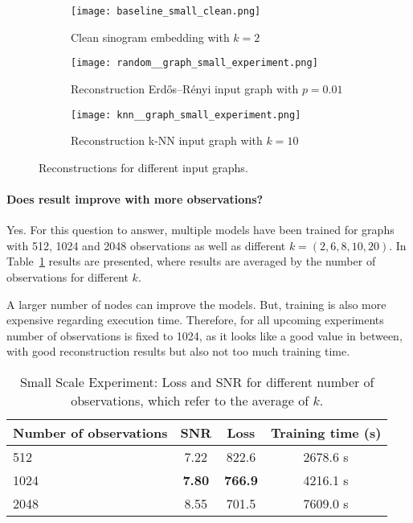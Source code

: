 \begin{figure}[H]
  \captionsetup[subfigure]{justification=centering}
  \centering
  \begin{subfigure}[t]{0.3\textwidth}
      \texttt{[image: baseline\_small\_clean.png]}
      \caption{Clean sinogram embedding with $k=2$}
      \label{fig:small_experiment_clean2}
  \end{subfigure}\hfill
  \begin{subfigure}[t]{0.3\textwidth}
    \texttt{[image: random\_\_graph\_small\_experiment.png]}
    \caption{Reconstruction Erdős–Rényi input graph with $p=0.01$}
    \label{fig:small_experiment_random_graph}
  \end{subfigure}\hfill
  \begin{subfigure}[t]{0.3\textwidth}
    \texttt{[image: knn\_\_graph\_small\_experiment.png]}
    \caption{Reconstruction k-NN input graph with $k=10$}
    \label{fig:small_experiment_knn_graph}
  \end{subfigure}
  \caption{Reconstructions for different input graphs.}
  \label{fig:input_graph_small}
\end{figure}



  \paragraph{Does result improve with more observations?}
  Yes.
  For this question to answer, multiple models have been trained for graphs with 512, 1024 and 2048 observations
  as well as different $k = (2,6,8,10,20)$.
  In Table~\ref{tab:graph_knn} results are presented, where results are averaged by the number of observations 
  for different $k$.

  A larger number of nodes can improve the models. 
  But, training is also more expensive regarding execution time. 
  Therefore, for all upcoming experiments number of observations is fixed to 1024, as it looks like a good
  value in between, with good reconstruction results but also not too much training time.
  
  \begin{table}[H]
    \centering
      \begin{tabular}{l|ccc}
      \toprule
      \small \textbf{Number of observations} & \small \textbf{SNR} & \small \textbf{Loss} & \textbf{Training time (s)}  \\ 
      \midrule
      512  &  7.22    &  822.6  & 2678.6 s \\ \hline
      1024 &  \textbf{7.80}    & \textbf{ 766.9}  & 4216.1 s \\ \hline
      2048 &  8.55    &  701.5  & 7609.0 s  \\ \hline
      \midrule
      \end{tabular}
    \caption{Small Scale Experiment: Loss and SNR for different number of observations, which refer to the average of 
    $k$.}
    \label{tab:graph_knn}
  \end{table}


